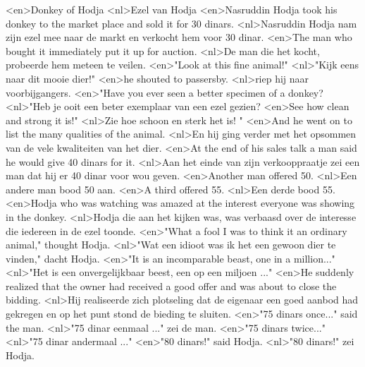 <en>Donkey of Hodja
<nl>Ezel van Hodja
<en>Nasruddin Hodja took his donkey to the market place and sold it for 30 dinars.
<nl>Nasruddin Hodja nam zijn ezel mee naar de markt en verkocht hem voor 30 dinar.
<en>The man who bought it immediately put it up for auction.
<nl>De man die het kocht, probeerde  hem meteen te veilen.
<en>"Look at this fine animal!"
<nl>"Kijk eens naar dit mooie dier!"
<en>he shouted to passersby.
<nl>riep hij naar voorbijgangers.
<en>"Have you ever seen a better specimen of a donkey?
<nl>"Heb je ooit een beter exemplaar van een ezel gezien?
<en>See how clean and strong it is!"
<nl>Zie hoe schoon en sterk het is! "
<en>And he went on to list the many qualities of the animal.
<nl>En hij ging verder met het opsommen van de vele kwaliteiten van het dier.
<en>At the end of his sales talk a man said he would give 40 dinars for it.
<nl>Aan het einde van zijn verkooppraatje zei een man dat hij er 40 dinar voor wou geven.
<en>Another man offered 50.
<nl>Een andere man bood 50 aan.
<en>A third offered 55.
<nl>Een derde bood 55.
<en>Hodja who was watching was amazed at the interest everyone was showing in the donkey.
<nl>Hodja die aan het kijken was, was verbaasd over de interesse die iedereen in de ezel toonde.
<en>"What a fool I was to think it an ordinary animal," thought Hodja.
<nl>"Wat een idioot was ik het een gewoon dier te vinden," dacht Hodja.
<en>"It is an incomparable beast, one in a million..." 
<nl>"Het is een onvergelijkbaar beest, een op een miljoen ..." 
<en>He suddenly realized that the owner had received a good offer and was about to close the bidding.
<nl>Hij realiseerde zich plotseling dat de eigenaar een goed aanbod had gekregen en op het punt stond de bieding te sluiten.
<en>"75 dinars once..." said the man.
<nl>"75 dinar eenmaal ..." zei de man.
<en>"75 dinars twice..." 
<nl>"75 dinar andermaal ..."
<en>"80 dinars!" said Hodja. 
<nl>"80 dinars!" zei Hodja.

